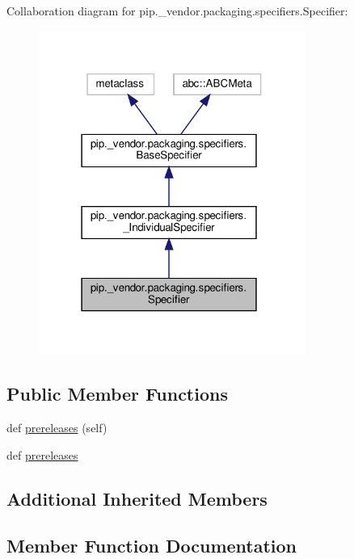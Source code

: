 Collaboration diagram for pip.\+\_\+vendor.\+packaging.\+specifiers.\+Specifier\+:
\nopagebreak
\begin{figure}[H]
\begin{center}
\leavevmode
\includegraphics[width=247pt]{classpip_1_1__vendor_1_1packaging_1_1specifiers_1_1Specifier__coll__graph}
\end{center}
\end{figure}
\subsection*{Public Member Functions}
\begin{DoxyCompactItemize}
\item 
def \hyperlink{classpip_1_1__vendor_1_1packaging_1_1specifiers_1_1Specifier_ace6ee9893e5239bb21c1abe09a596964}{prereleases} (self)
\item 
def \hyperlink{classpip_1_1__vendor_1_1packaging_1_1specifiers_1_1Specifier_a7ff6f5b265f60fe0942a4a3dd50e43ad}{prereleases}
\end{DoxyCompactItemize}
\subsection*{Additional Inherited Members}


\subsection{Member Function Documentation}
\mbox{\label{classpip_1_1__vendor_1_1packaging_1_1specifiers_1_1Specifier_ace6ee9893e5239bb21c1abe09a596964}} 
